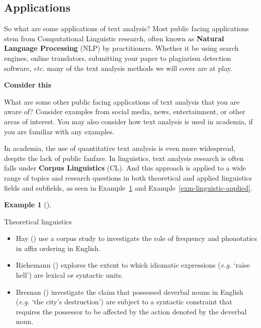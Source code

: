 \documentclass[
  letterpaper,
  krantz1]{latex/krantz-mod}
\providecommand{\tightlist}{%
  \setlength{\itemsep}{0pt}\setlength{\parskip}{0pt}}\usepackage{longtable,booktabs,array}
\theoremstyle{definition}
\newtheorem{example}{Example}[chapter]
\theoremstyle{definition}
\theoremstyle{remark}
\begin{document}
\subsection{Applications}\label{applications}

So what are some applications of text analysis? Most public facing
applications stem from Computational Linguistic research, often known as
\textbf{Natural Language Processing} (NLP) by practitioners. Whether it
be using search engines, online translators, submitting your paper to
plagiarism detection software, \emph{etc.} many of the text analysis
methods we will cover are at play.

\begin{tcolorbox}[enhanced jigsaw, leftrule=.75mm, colframe=quarto-callout-color-frame, left=2mm, colback=white, toprule=.15mm, breakable, arc=.35mm, opacityback=0, bottomrule=.15mm, rightrule=.15mm]

\textbf{ Consider this}

What are some other public facing applications of text analysis that you
are aware of? Consider examples from social media, news, entertainment,
or other areas of interest. You may also consider how text analysis is
used in academia, if you are familiar with any examples.

\end{tcolorbox}

In academia, the use of quantitative text analysis is even more
widespread, despite the lack of public fanfare. In linguistics, text
analysis research is often falls under
\textbf{Corpus Linguistics} (CL). And this
approach is applied to a wide range of topics and research questions in
both theoretical and applied linguistics fields and subfields, as seen
in Example~\ref{exm-linguistic-theory} and
Example~\ref{exm-linguistic-applied}.

\begin{example}[]\protect\hypertarget{exm-linguistic-theory}{}\label{exm-linguistic-theory}

Theoretical linguistics

\begin{itemize}
\tightlist
\item
  Hay () use a corpus study to investigate
  the role of frequency and phonotatics in affix ordering in English.
\item
  Riehemann () explores the extent to
  which idiomatic expressions (\emph{e.g.} `raise hell') are lexical or
  syntactic units.
\item
  Bresnan () investigate the claim that
  possessed deverbal nouns in English (\emph{e.g.} `the city's
  destruction') are subject to a syntactic constraint that requires the
  possessor to be affected by the action denoted by the deverbal noun.
\end{itemize}

\end{example}
\end{document}
